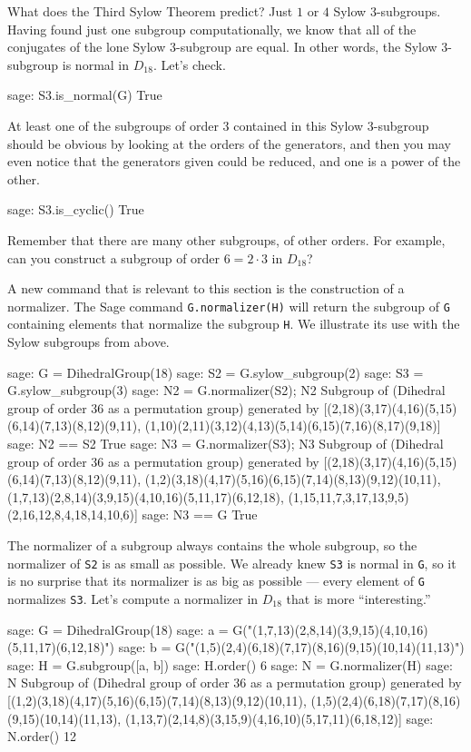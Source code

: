 %
What does the Third Sylow Theorem predict?  Just $1$ or $4$ Sylow $3$-subgroups.  Having found just one subgroup computationally, we know that all of the conjugates of the lone Sylow $3$-subgroup are equal.  In other words, the Sylow $3$-subgroup is normal in $D_{18}$.  Let's check.
%
\begin{sageexample}
sage: S3.is_normal(G)
True
\end{sageexample}
%
At least one of the subgroups of order $3$ contained in this Sylow $3$-subgroup should be obvious by looking at the orders of the generators, and then you may even notice that the generators given could be reduced, and one is a power of the other.
%
\begin{sageexample}
sage: S3.is_cyclic()
True
\end{sageexample}
%
Remember that there are many other subgroups, of other orders.  For example, can you construct a subgroup of order $6=2\cdot 3$ in $D_{18}$?\par
%
%
A new command that is relevant to this section is the construction of a normalizer.  The Sage command \verb?G.normalizer(H)? will return the subgroup of \verb?G? containing elements that normalize the subgroup \verb?H?.  We illustrate its use with the Sylow subgroups from above.
%
\begin{sageexample}
sage: G = DihedralGroup(18)
sage: S2 = G.sylow_subgroup(2)
sage: S3 = G.sylow_subgroup(3)
sage: N2 = G.normalizer(S2); N2
Subgroup of (Dihedral group of order 36 as a permutation group) 
generated by 
[(2,18)(3,17)(4,16)(5,15)(6,14)(7,13)(8,12)(9,11), 
(1,10)(2,11)(3,12)(4,13)(5,14)(6,15)(7,16)(8,17)(9,18)]
sage: N2 == S2
True
sage: N3 = G.normalizer(S3); N3
Subgroup of (Dihedral group of order 36 as a permutation group) 
generated by 
[(2,18)(3,17)(4,16)(5,15)(6,14)(7,13)(8,12)(9,11), 
(1,2)(3,18)(4,17)(5,16)(6,15)(7,14)(8,13)(9,12)(10,11), 
(1,7,13)(2,8,14)(3,9,15)(4,10,16)(5,11,17)(6,12,18), 
(1,15,11,7,3,17,13,9,5)(2,16,12,8,4,18,14,10,6)]
sage: N3 == G
True
\end{sageexample}
%
The normalizer of a subgroup always contains the whole subgroup, so the normalizer of \verb?S2? is as small as possible.  We already knew \verb?S3? is normal in \verb?G?, so it is no surprise that its normalizer is as big as possible --- every element of \verb?G? normalizes \verb?S3?.  Let's compute a normalizer in $D_{18}$ that is more ``interesting.''
%
\begin{sageexample}
sage: G = DihedralGroup(18)
sage: a = G("(1,7,13)(2,8,14)(3,9,15)(4,10,16)(5,11,17)(6,12,18)")
sage: b = G("(1,5)(2,4)(6,18)(7,17)(8,16)(9,15)(10,14)(11,13)")
sage: H = G.subgroup([a, b])
sage: H.order()
6
sage: N = G.normalizer(H)
sage: N
Subgroup of (Dihedral group of order 36 as a permutation group) 
generated by 
[(1,2)(3,18)(4,17)(5,16)(6,15)(7,14)(8,13)(9,12)(10,11), 
(1,5)(2,4)(6,18)(7,17)(8,16)(9,15)(10,14)(11,13), 
(1,13,7)(2,14,8)(3,15,9)(4,16,10)(5,17,11)(6,18,12)]
sage: N.order()
12
\end{sageexample}
